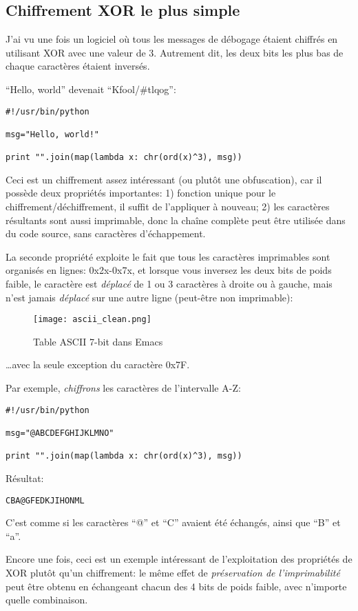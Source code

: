 \subsection{Chiffrement XOR le plus simple}

J'ai vu une fois un logiciel où tous les messages de débogage étaient chiffrés en
utilisant XOR avec une valeur de 3.
Autrement dit, les deux bits les plus bas de chaque caractères étaient inversés.

``Hello, world'' devenait ``Kfool/\#tlqog'':

\begin{lstlisting}
#!/usr/bin/python

msg="Hello, world!"

print "".join(map(lambda x: chr(ord(x)^3), msg))
\end{lstlisting}

Ceci est un chiffrement assez intéressant (ou plutôt une obfuscation), car il possède
deux propriétés importantes:
1) fonction unique pour le chiffrement/déchiffrement, il suffit de l'appliquer à nouveau;
2) les caractères résultants sont aussi imprimable, donc la chaîne complète peut être
utilisée dans du code source, sans caractères d'échappement.

La seconde propriété exploite le fait que tous les caractères imprimables sont organisés
en lignes: 0x2x-0x7x, et lorsque vous inversez les deux bits de poids faible, le caractère
est \emph{déplacé} de 1 ou 3 caractères à droite ou à gauche, mais n'est jamais \emph{déplacé}
sur une autre ligne (peut-être non imprimable):

\begin{figure}[H]
\centering
\texttt{[image: ascii\_clean.png]}
\caption{Table \ac{ASCII} 7-bit dans Emacs}
\end{figure}

\dots avec la seule exception du caractère 0x7F.

Par exemple, \emph{chiffrons} les caractères de l'intervalle A-Z:

\begin{lstlisting}
#!/usr/bin/python

msg="@ABCDEFGHIJKLMNO"

print "".join(map(lambda x: chr(ord(x)^3), msg))
\end{lstlisting}

Résultat:
\begin{lstlisting}
CBA@GFEDKJIHONML
\end{lstlisting}

C'est comme si les caractères ``@'' et ``C'' avaient été échangés, ainsi que ``B''
et ``a''.

Encore une fois, ceci est un exemple intéressant de l'exploitation des propriétés
de XOR plutôt qu'un chiffrement:
le même effet de \emph{préservation de l'imprimabilité} peut être obtenu en échangeant
chacun des 4 bits de poids faible, avec n'importe quelle combinaison.

